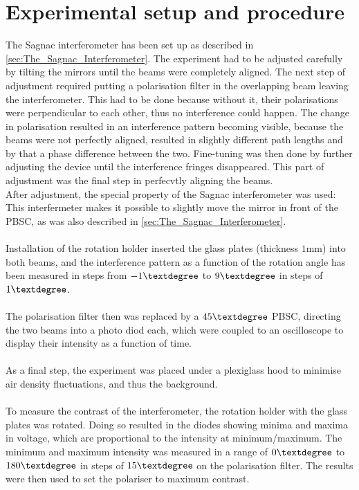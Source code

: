 \section{Experimental setup and procedure}
\label{sec:Durchführung}
The Sagnac interferometer has been set up as described in \autoref{sec:The_Sagnac_Interferometer}. The experiment had to be adjusted carefully by tilting the mirrors until the beams were completely aligned. The next step of adjustment required putting a polarisation filter in the overlapping beam leaving the interferometer. This had to be done because without it, their polarisations were perpendicular to each other, thus no interference could happen. The change in polarisation resulted in an interference pattern becoming visible, because the beams were not perfectly aligned, resulted in slightly different path lengths and by that a phase difference between the two. Fine-tuning was then done by further adjusting the device until the interference fringes disappeared. This part of adjustment was the final step in perfecvtly aligning the beams.\\ 
After adjustment, the special property of the Sagnac interferometer was used: This interfermeter makes it possible to slightly move the mirror in front of the PBSC, as was also described in \autoref{sec:The_Sagnac_Interferometer}.\\\\
Installation of the rotation holder inserted the glass plates (thickness $1 \text{mm}$) into both beams, and the interference pattern as a function of the rotation angle has been measured in steps from $-1\textdegree$ to $9\textdegree$ in steps of $1\textdegree$.\\\\
The polarisation filter then was replaced by a $45\textdegree$ PBSC, directing the two beams into a photo diod each, which were coupled to an oscilloscope to display their intensity as a function of time.\\
\\
As a final step, the experiment was placed under a plexiglass hood to minimise air density fluctuations, and thus the background.\\
\\
To measure the contrast of the interferometer, the rotation holder with the glass plates was rotated. Doing so resulted in the diodes showing minima and maxima in voltage, which are proportional to the intensity at minimum/maximum. The minimum and maximum intensity was measured in a range of $0\textdegree$ to $180\textdegree$ in steps of $15\textdegree$ on the polarisation filter. The results were then used to set the polariser to maximum contrast.\\
